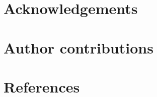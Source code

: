 \documentclass[9pt, twocolumn, lineno]{setting/pi/pi-article}
\begin{document}




\section*{Acknowledgements}


\section*{Author contributions}




\section*{References}


\end{document}
